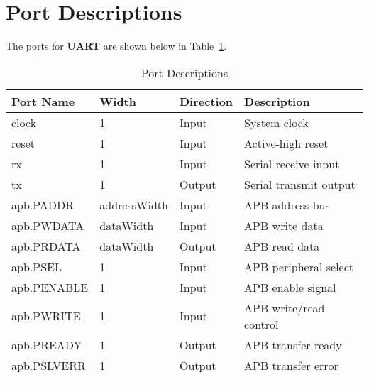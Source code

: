 \section{Port Descriptions}
The ports for \textbf{UART} are shown below in Table~\ref{table:ports}.

\renewcommand*{\arraystretch}{1.4}
\begin{longtable}[H]{
  | p{}
  | p{}
  | p{}
  | p{} |
  }
  \hline
  \textbf{Port Name} &
  \textbf{Width} &
  \textbf{Direction} &
  \textbf{Description} \\ \hline \hline
  clock &
  1 &
  Input &
  System clock \\ \hline
  reset &
  1 &
  Input &
  Active-high reset \\ \hline
  rx &
  1 &
  Input &
  Serial receive input \\ \hline
  tx &
  1 &
  Output &
  Serial transmit output \\ \hline
  apb.PADDR &
  addressWidth &
  Input &
  APB address bus \\ \hline
  apb.PWDATA &
  dataWidth &
  Input &
  APB write data \\ \hline
  apb.PRDATA &
  dataWidth &
  Output &
  APB read data \\ \hline
  apb.PSEL &
  1 &
  Input &
  APB peripheral select \\ \hline
  apb.PENABLE &
  1 &
  Input &
  APB enable signal \\ \hline
  apb.PWRITE &
  1 &
  Input &
  APB write/read control \\ \hline
  apb.PREADY &
  1 &
  Output &
  APB transfer ready \\ \hline
  apb.PSLVERR &
  1 &
  Output &
  APB transfer error \\ \hline
  
  \caption{Port Descriptions}\label{table:ports}
\end{longtable}